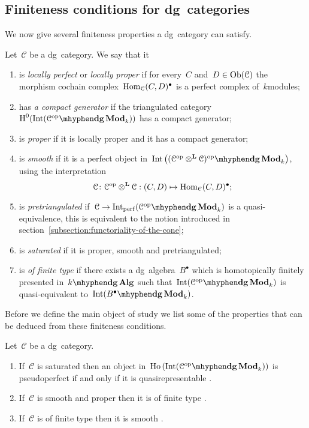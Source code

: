 \begin{refsection}
\subsection{Finiteness conditions for dg~categories}
We now give several finiteness properties a dg~category can satisfy.
\begin{definition}
  Let~$\mathcal{C}$ be a dg~category. We say that it
  \begin{enumerate}
    \item is \emph{locally perfect} or \emph{locally proper} if for every~$C$ and~$D\in\operatorname{Ob}(\mathcal{C})$ the morphism cochain complex~$\mathrm{Hom}_{\mathcal{C}}(C,D)^\bullet$ is a perfect complex of~$k$\dash modules;
    \item has \emph{a compact generator} if the triangulated category~$\HH^0(\Int({\mathcal{C}^\opp}\mhyphen\dgMod_k))$ has a compact generator;
    \item is \emph{proper} if it is locally proper and it has a compact generator;
    \item is \emph{smooth} if it is a perfect object in~$\Int\left( {(\mathcal{C}^\opp\otimes^{\mathbf{L}}\mathcal{C})^\opp}\mhyphen\dgMod_k \right)$, using the interpretation
      \begin{equation}
        \mathcal{C}\colon\mathcal{C}^{\mathrm{op}}\otimes^{\mathbf{L}}\mathcal{C}:(C,D)\mapsto\mathrm{Hom}_{\mathcal{C}}(C,D)^\bullet;
      \end{equation}
    \item is \emph{pretriangulated} if~$\mathcal{C}\to\Int_\perf({\mathcal{C}^\opp}\mhyphen\dgMod_k)$ is a quasi-equivalence, this is equivalent to the notion introduced in section~\ref{subsection:functoriality-of-the-cone};
    \item is \emph{saturated} if it is proper, smooth and pretriangulated;
    \item is \emph{of finite type} if there exists a dg~algebra~$B^\bullet$ which is homotopically finitely presented in~$\dgAlg$ such that~$\Int({\mathcal{C}^\opp}\mhyphen\dgMod_k)$ is quasi-equivalent to~$\Int({B^\bullet}\mhyphen\dgMod_k)$.
  \end{enumerate}
\end{definition}
Before we define the main object of study we list some of the properties that can be deduced from these finiteness conditions.
\begin{proposition}
  \label{proposition:dg-properties}
  Let~$\mathcal{C}$ be a dg~category.
  \begin{enumerate}
    \item If~$\mathcal{C}$ is saturated then an object in~$\Ho(\Int({\mathcal{C}^\opp}\mhyphen\dgMod_k))$ is pseudoperfect if and only if it is quasirepresentable \cite[corollary 2.9(2)]{toen-vaquie}.
    \item If~$\mathcal{C}$ is smooth and proper then it is of finite type \cite[corollary 2.13]{toen-vaquie}.
    \item If~$\mathcal{C}$ is of finite type then it is smooth \cite[corollary 2.14]{toen-vaquie}.
  \end{enumerate}
\end{proposition}


\end{refsection}
